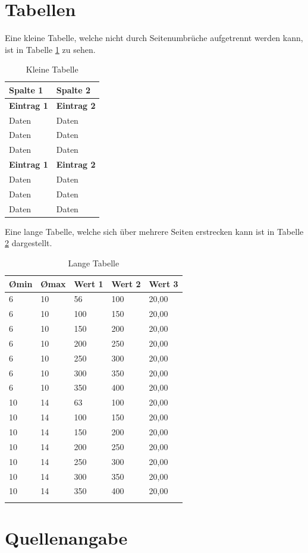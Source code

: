 \section{Tabellen}

Eine kleine Tabelle, welche nicht durch Seitenumbrüche aufgetrennt werden kann, ist in Tabelle \ref{tab:kleine-tabelle} zu sehen.

\begin{center}
\begin{table}[ht]
\begin{tabular}{| p{3.5cm} | p{10.5cm} |}
\hline
\textbf{Spalte 1}& \textbf{Spalte 2}\\
\hline
\textbf{Eintrag 1}& \textbf{Eintrag 2}\\
Daten& Daten\\
Daten& Daten\\
Daten& Daten\\
\hline
\textbf{Eintrag 1}& \textbf{Eintrag 2}\\
Daten& Daten\\
Daten& Daten\\
Daten& Daten\\
\hline
\end{tabular}
\caption{Kleine Tabelle}
\label{tab:kleine-tabelle}
\end{table}
\end{center}

Eine lange Tabelle, welche sich über mehrere Seiten erstrecken kann ist in Tabelle \ref{tab:lange-tabelle} dargestellt.

\begin{longtable}{|p{2cm} | p{2cm} | p{2cm} | p{2cm} | p{2cm} |}
\hline
\textbf{\O min}& \textbf{\O max}& \textbf{Wert 1}& \textbf{Wert 2}& \textbf{Wert 3}\\
\hline
6& 10& 56& 100& 20,00\\
\hline
6& 10& 100& 150& 20,00\\
\hline
6& 10& 150& 200& 20,00\\
\hline
6& 10& 200& 250& 20,00\\
\hline
6& 10& 250& 300& 20,00\\
\hline
6& 10& 300& 350& 20,00\\
\hline
6& 10& 350& 400& 20,00\\
\hline
10& 14& 63& 100& 20,00\\
\hline
10& 14& 100& 150& 20,00\\
\hline
10& 14& 150& 200& 20,00\\
\hline
10& 14& 200& 250& 20,00\\
\hline
10& 14& 250& 300& 20,00\\
\hline
10& 14& 300& 350& 20,00\\
\hline
10& 14& 350& 400& 20,00\\
\hline
\caption{Lange Tabelle}
\label{tab:lange-tabelle}
\end{longtable}

\section{Quellenangabe}
